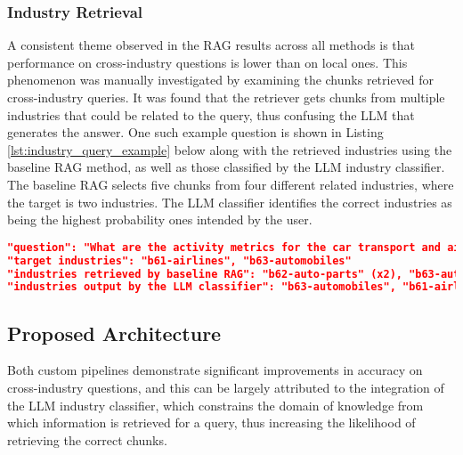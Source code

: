 \subsubsection{Industry Retrieval}

A consistent theme observed in the RAG results across all methods is that performance on cross-industry questions is lower than on local ones. This phenomenon was manually investigated by examining the chunks retrieved for cross-industry queries. It was found that the retriever gets chunks from multiple industries that could be related to the query, thus confusing the LLM that generates the answer. One such example question is shown in Listing \ref{lst:industry_query_example} below along with the retrieved industries using the baseline RAG method, as well as those classified by the LLM industry classifier. The baseline RAG selects five chunks from four different related industries, where the target is two industries. The LLM classifier identifies the correct industries as being the highest probability ones intended by the user.


\begin{lstlisting}[language=json,firstnumber=1,label={lst:industry_query_example},caption={Example cross-industry single-hop question}]
"question": "What are the activity metrics for the car transport and air transport industries?"
"target industries": "b61-airlines", "b63-automobiles"
"industries retrieved by baseline RAG": "b62-auto-parts" (x2), "b63-automobiles", "b60-air-freight-and-logistics", "b61-airlines"
"industries output by the LLM classifier": "b63-automobiles", "b61-airlines"
\end{lstlisting}


\subsection{Proposed Architecture}

Both custom pipelines demonstrate significant improvements in accuracy on cross-industry questions, and this can be largely attributed to the integration of the LLM industry classifier, which constrains the domain of knowledge from which information is retrieved for a query, thus increasing the likelihood of retrieving the correct chunks. \\

